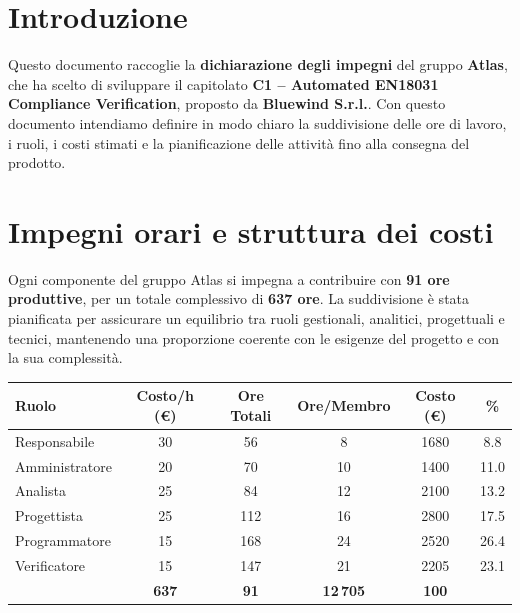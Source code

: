 \documentclass[a4paper,12pt]{article}
\begin{document}
\newpage

\tableofcontents

\newpage


\section{Introduzione}
Questo documento raccoglie la \textbf{dichiarazione degli impegni} del gruppo \textbf{Atlas}, che ha scelto di sviluppare il capitolato \textbf{C1 – Automated EN18031 Compliance Verification}, proposto da \textbf{Bluewind S.r.l.}.
Con questo documento intendiamo definire in modo chiaro la suddivisione delle ore di lavoro, i ruoli, i costi stimati e la pianificazione delle attività fino alla consegna del prodotto.

\section{Impegni orari e struttura dei costi}
Ogni componente del gruppo Atlas si impegna a contribuire con \textbf{91 ore produttive}, per un totale complessivo di \textbf{637 ore}.  
La suddivisione è stata pianificata per assicurare un equilibrio tra ruoli gestionali, analitici, progettuali e tecnici, mantenendo una proporzione coerente con le esigenze del progetto e con la sua complessità.

\begin{center}
\begin{tabular}{|l|c|c|c|c|c|}
    \hline
    \rowcolor{gray!20}
    \textbf{Ruolo} & \textbf{Costo/h (€)} & \textbf{Ore Totali} & \textbf{Ore/Membro} & \textbf{Costo (€)} & \textbf{\%} \\
    \hline
    Responsabile & 30 & 56 & 8  & 1680 & 8.8 \\
    \hline
    Amministratore & 20 & 70 & 10 & 1400 & 11.0 \\
    \hline
    Analista & 25 & 84 & 12 & 2100 & 13.2 \\
    \hline
    Progettista & 25 & 112 & 16 & 2800 & 17.5 \\
    \hline
    Programmatore & 15 & 168 & 24 & 2520 & 26.4 \\
    \hline
    Verificatore & 15 & 147 & 21 & 2205 & 23.1 \\
    \hline
    \rowcolor{gray!20}
    \multicolumn{2}{|c|}{\textbf{Totale}} & \textbf{637} & \textbf{91} & \textbf{12\,705} & \textbf{100} \\
    \hline
\end{tabular}
\end{center}
\end{document}
